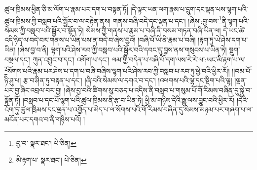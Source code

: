 ཚུལ་ཁྲིམས་ཕྱིན་ཅི་མ་ལོག་པ་རྣམ་པར་དག་པ་བསྟན་ཏོ། །དེ་ལྟར་ཡན་ལག་རྣམ་པ་དྲུག་དང་ལྡན་པས་ལྷག་པའི་ཚུལ་ཁྲིམས་ཀྱི་བསླབ་པའི་སྦྱོར་བ་ལ་བརྟེན་ནས། གནས་བཞི་བདེ་དང་ལྡན་པ་དང་། །ཞེས་:བྱ་བས་\footnote{བྱ་བ་  སྣར་ཐང་།  པེ་ཅིན། }ནི་ལྷག་པའི་སེམས་ཀྱི་བསླབ་པའི་སྦྱོར་བ་སྟོན་ཏེ། སེམས་ཀྱི་གནས་པ་རྣམ་པ་བཞི་ནི་བསམ་གཏན་བཞི་ཡིན་ལ། དེ་ཡང་ཚེ་འདི་ཉིད་ལ་བདེ་བར་གནས་པ་ཡིན་པས་ན་བདེ་བ་ཞེས་བྱའོ། །བཞི་པོ་ཡི་ནི་རྣམ་པ་བཞི། །རྟག་ཏུ་ཡེ་ཤེས་དག་པ་ཡིན། །ཞེས་བྱ་བ་ནི། ལྷག་པའི་ཤེས་རབ་ཀྱི་བསླབ་པའི་སྦྱོར་བའི་དབང་དུ་བྱས་ནས་གསུངས་པ་ཡིན་ཏེ། སྡུག་བསྔལ་དང་། ཀུན་འབྱུང་བ་དང་། འགོག་པ་དང་། ལམ་གྱི་བདེན་པ་བཞི་པོ་དག་ལས་རེ་རེ་ལ་:ཡང་མི་རྟག་པ་ལ་\footnote{མི་རྟག་པ་  སྣར་ཐང་།  པེ་ཅིན། }སོགས་པའི་རྣམ་པར་ཤེས་པ་དག་པ་བཞི་བཞིས་ལྷག་པའི་ཤེས་རབ་ཀྱི་བསླབ་པ་རབ་ཏུ་ཕྱེ་བའི་ཕྱིར་རོ།། །།བམ་པོ་ཉི་ཤུ་པ། རྩ་བ་ཤིན་ཏུ་བརྟན་པ་དང་། །ཞི་བའི་སེམས་ལ་དགའ་བ་དང་། །འཕགས་པའི་ལྷ་དང་སྡིག་པའི་ལྷ། །ལྡན་པར་བྱ་ཞིང་འབྲལ་བར་བྱ། །ཞེས་བྱ་བའི་ཚིགས་སུ་བཅད་པ་འདིས་ནི་བསླབ་པ་གསུམ་པོ་གོ་རིམས་བཞིན་དུ་སྐྱེ་བ་སྟོན་ཏོ། །བསླབ་པ་དང་པོ་ལྷག་པའི་ཚུལ་ཁྲིམས་ནི་རྩ་བ་ཡིན་ཏེ། ཕྱི་མ་གཉིས་དེའི་རྒྱུ་ལས་བྱུང་བའི་ཕྱིར་རོ། །དེའི་འོག་ཏུ་ཚུལ་ཁྲིམས་དང་ལྡན་པ་འགྱོད་པ་མེད་པ་ལ་སོགས་པའི་གོ་རིམས་བཞིན་དུ་སེམས་མཉམ་པར་གཞག་པ་ལ་མངོན་པར་དགའ་བ་ནི་གཉིས་པའོ། །
